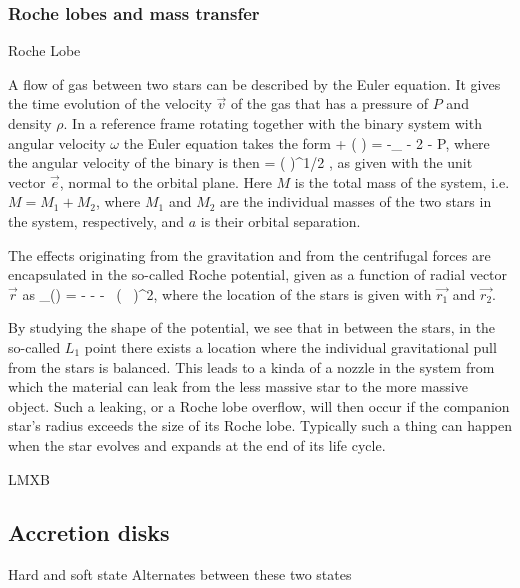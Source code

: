 \subsubsection{Roche lobes and mass transfer}
Roche Lobe \cite{PRP02} \cite{LL15}

A flow of gas between two stars can be described by the Euler equation.
It gives the time evolution of the velocity $\vec{v}$ of the gas that has a pressure of $P$ and density $\rho$.
In a reference frame rotating together with the binary system with angular velocity $\omega$ the Euler equation takes the form 
\be
{} + ( \cdot \nabla) = -\nabla \Phi_{} - 2 \vec{ \omega } \times {} -  \nabla P,
\ee
where the angular velocity of the binary is then
\be
\vec{ \omega } = \left(  \right)^{1/2} ,
\ee
as given with the unit vector $\vec{e}$, normal to the orbital plane.
Here $M$ is the total mass of the system, i.e. $M = M_1 + M_2$, where $M_1$ and $M_2$ are the individual masses of the two stars in the system, respectively, and $a$ is their orbital separation.

The effects originating from the gravitation and from the centrifugal forces are encapsulated in the so-called Roche potential, given as a function of radial vector $\vec{r}$ as
\be
\Phi_{}() = - - -  ( \vec{ \omega } \times {} )^2,
\ee
where the location of the stars is given with $\vec{r_1}$ and $\vec{r_2}$.

By studying the shape of the potential, we see that in between the stars, in the so-called $L_1$ point there exists a location where the individual gravitational pull from the stars is balanced.
This leads to a kinda of a nozzle in the system from which the material can leak from the less massive star to the more massive object.
Such a leaking, or a Roche lobe overflow, will then occur if the companion star's radius exceeds the size of its Roche lobe.
Typically such a thing can happen when the star evolves and expands at the end of its life cycle. 

LMXB \cite{TH06}


\subsection{Accretion disks}
Hard and soft state \cite{HvdK89}
Alternates between these two states \cite{MDF14} \cite{DGK07}



